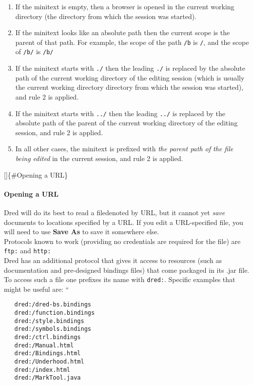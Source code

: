 \documentclass[
]{article}
\providecommand{\tightlist}{%
  \setlength{\itemsep}{0pt}\setlength{\parskip}{0pt}}
\begin{document}
\begin{enumerate}
\def\labelenumi{\arabic{enumi}.}
\tightlist
\item
  If the minitext is empty, then a browser is opened in the current
  working directory (the directory from which the session was started).
\item
  If the minitext looks like an absolute path then the current scope is
  the parent of that path. For example, the scope of the path
  \texttt{/b} is \texttt{/}, and the scope of \texttt{/b/} is
  \texttt{/b/}
\item
  If the minitext starts with \texttt{./} then the leading \texttt{./}
  is replaced by the absolute path of the current working directory of
  the editing session (which is usually the current working directory
  directory from which the session was started), and rule 2 is applied.
\item
  If the minitext starts with \texttt{../} then the leading \texttt{../}
  is replaced by the absolute path of the parent of the current working
  directory of the editing session, and rule 2 is applied.
\item
  In all other cases, the minitext is prefixed with \emph{the parent
  path of the file being edited} in the current session, and rule 2 is
  applied.
\end{enumerate}

{[}{]}\{\#Opening a URL\}

\hypertarget{opening-a-url}{%
\paragraph{Opening a URL}\label{opening-a-url}}

Dred will do its best to read a filedenoted by URL, but it cannot yet
\emph{save} documents to locations specified by a URL. If you edit a
URL-specified file, you will need to use \textbf{Save As} to save it
somewhere else.\\
Protocols known to work (providing no credentials are required for the
file) are \texttt{ftp:} and \texttt{http:}\\
Dred has an additional protocol that gives it access to resources (such
as documentation and pre-designed bindings files) that come packaged in
its .jar file. To access such a file one prefixes its name with
\texttt{dred:}. Specific examples that might be useful are: ``

\begin{verbatim}
   dred:/dred-bs.bindings
   dred:/function.bindings
   dred:/style.bindings
   dred:/symbols.bindings
   dred:/ctrl.bindings
   dred:/Manual.html
   dred:/Bindings.html
   dred:/Underhood.html
   dred:/index.html
   dred:/MarkTool.java
\end{verbatim}
\end{document}
